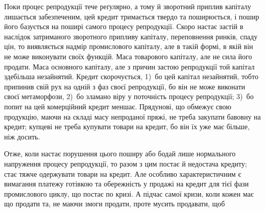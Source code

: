 Поки процес репродукції тече реґулярно, а тому й зворотний приплив капіталу
лишається забезпеченим, цей кредит тримається твердо та поширюється, і пошир
його базується на поширі самого процесу репродукції. Скоро настає застій
в наслідок затриманого зворотного припливу капіталу, переповнення ринків, спаду
цін, то виявляється надмір промислового капіталу, але в такій формі, в якій він
не може виконувати своїх функцій. Маса товарового капіталу, але не сила
його продати. Маса основного капіталу, але з причин застою репродукції той
капітал здебільша незайнятий. Кредит скорочується, 1)~бо цей капітал незайнятий,
тобто припинив свій рух на одній з фаз своєї репродукції, бо він не може
виконати своєї метаморфози, 2)~бо зламано віру у поточність процесу репродукції;
3)~бо попит на цей комерційний кредит меншає. Прядунові, що обмежує
свою продукцію, маючи на складі масу непроданої пряжі, не треба закупати
бавовну на кредит; купцеві не треба купувати товари на кредит, бо він їх
уже має більше, ніж досить.

Отже, коли настає порушення цього поширу або бодай лише нормального
напруження процесу репродукції, то разом з цим постає й недостача кредиту;
стає тяжче одержувати товари на кредит. Але особливо характеристичним є вимагання
платежу готівкою та обережність у продажі на кредит для тієї фази
промислового циклу, що постає по кризі. А підчас самої кризи, коли кожен
має що продати та, не маючи змоги продати, проте мусить продавати, щоб
\parbreak{}  %
